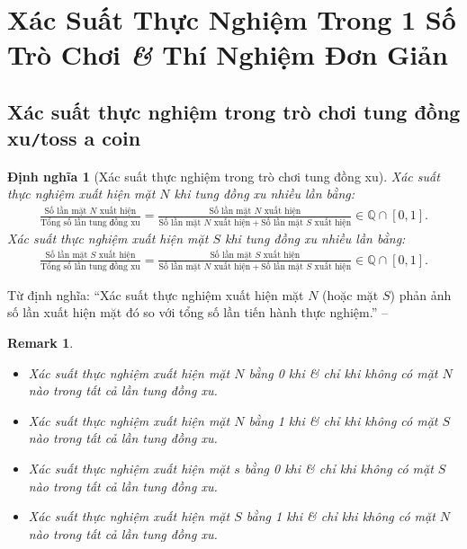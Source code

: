 \documentclass[oneside]{book}
\numberwithin{equation}{section}
\newtheorem{dinhnghia}{Định nghĩa}[section]
\newtheorem{remark}{Remark}[section]
\begin{document}

\section{Xác Suất Thực Nghiệm Trong 1 Số Trò Chơi \textit{\&} Thí Nghiệm Đơn Giản}

\subsection{Xác suất thực nghiệm trong trò chơi tung đồng xu\texttt{/}toss a coin}
\begin{dinhnghia}[Xác suất thực nghiệm trong trò chơi tung đồng xu]
	\emph{Xác suất thực nghiệm xuất hiện mặt $N$} khi tung đồng xu nhiều lần bằng:
	\begin{align*}
		\frac{\mbox{Số lần mặt $N$ xuất hiện}}{\mbox{Tổng số lần tung đồng xu}} = \frac{\mbox{Số lần mặt $N$ xuất hiện}}{\mbox{Số lần mặt $N$ xuất hiện} + \mbox{Số lần mặt $S$ xuất hiện}}\in\mathbb{Q}\cap[0,1].
	\end{align*}
	\emph{Xác suất thực nghiệm xuất hiện mặt $S$} khi tung đồng xu nhiều lần bằng:
	\begin{align*}
		\frac{\mbox{Số lần mặt $S$ xuất hiện}}{\mbox{Tổng số lần tung đồng xu}} = \frac{\mbox{Số lần mặt $S$ xuất hiện}}{\mbox{Số lần mặt $N$ xuất hiện} + \mbox{Số lần mặt $S$ xuất hiện}}\in\mathbb{Q}\cap[0,1].
	\end{align*}
\end{dinhnghia}
Từ định nghĩa: ``Xác suất thực nghiệm xuất hiện mặt $N$ (hoặc mặt $S$) phản ảnh số lần xuất hiện mặt đó so với tổng số lần tiến hành thực nghiệm.'' -- \cite[p. 18]{Thai_Anh_Dat_Ha_Loan_Nam_Quang_Toan_6_tap_2}

\begin{remark}
	\begin{itemize}
		\item Xác suất thực nghiệm xuất hiện mặt $N$ bằng 0 khi \textit{\&} chỉ khi không có mặt $N$ nào trong tất cả lần tung đồng xu.
		\item Xác suất thực nghiệm xuất hiện mặt $N$ bằng 1 khi \textit{\&} chỉ khi không có mặt $S$ nào trong tất cả lần tung đồng xu.
		\item Xác suất thực nghiệm xuất hiện mặt $s$ bằng 0 khi \textit{\&} chỉ khi không có mặt $S$ nào trong tất cả lần tung đồng xu.
		\item Xác suất thực nghiệm xuất hiện mặt $S$ bằng 1 khi \textit{\&} chỉ khi không có mặt $N$ nào trong tất cả lần tung đồng xu.
	\end{itemize}
\end{remark}
\end{document}
